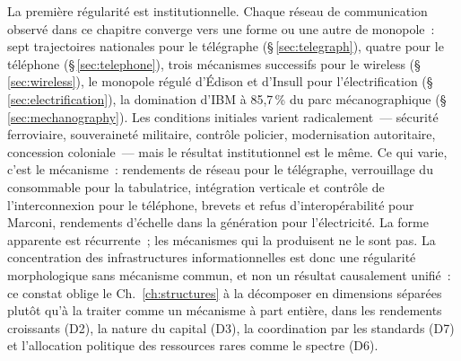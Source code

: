 La première régularité est institutionnelle. Chaque réseau de communication observé dans ce chapitre converge vers une forme ou une autre de monopole~: sept trajectoires nationales pour le télégraphe (§\,\ref{sec:telegraph}), quatre pour le téléphone (§\,\ref{sec:telephone}), trois mécanismes successifs pour le wireless (§\,\ref{sec:wireless}), le monopole régulé d'Édison et d'Insull pour l'électrification (§\,\ref{sec:electrification}), la domination d'IBM à 85,7\,\% du parc mécanographique (§\,\ref{sec:mechanography}). Les conditions initiales varient radicalement~--- sécurité ferroviaire, souveraineté militaire, contrôle policier, modernisation autoritaire, concession coloniale~--- mais le résultat institutionnel est le même. Ce qui varie, c'est le mécanisme~: rendements de réseau pour le télégraphe, verrouillage du consommable pour la tabulatrice, intégration verticale et contrôle de l'interconnexion pour le téléphone, brevets et refus d'interopérabilité pour Marconi, rendements d'échelle dans la génération pour l'électricité. La forme apparente est récurrente~; les mécanismes qui la produisent ne le sont pas. La concentration des infrastructures informationnelles est donc une régularité morphologique sans mécanisme commun, et non un résultat causalement unifié~: ce constat oblige le Ch.~\ref{ch:structures} à la décomposer en dimensions séparées plutôt qu'à la traiter comme un mécanisme à part entière, dans les rendements croissants (D2), la nature du capital (D3), la coordination par les standards (D7) et l'allocation politique des ressources rares comme le spectre (D6).

